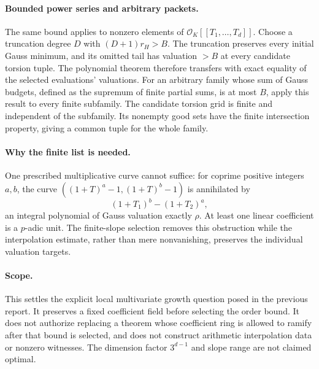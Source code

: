 \paragraph{Bounded power series and arbitrary packets.}
The same bound applies to nonzero elements of
$\mathcal O_K[[T_1,\ldots,T_d]]$. Choose a truncation degree $D$ with
$(D+1)r_H>B$. The truncation preserves every initial Gauss minimum, and
its omitted tail has valuation $>B$ at every candidate torsion tuple.
The polynomial theorem therefore transfers with exact equality of the
selected evaluations' valuations. For an arbitrary family whose sum of
Gauss budgets, defined as the supremum of finite partial sums, is at most
$B$, apply this result to every finite subfamily. The candidate torsion
grid is finite and independent of the subfamily. Its nonempty good sets
have the finite intersection property, giving a common tuple for the
whole family.

\paragraph{Why the finite list is needed.}
One prescribed multiplicative curve cannot suffice: for coprime positive
integers $a,b$, the curve
$((1+T)^a-1,(1+T)^b-1)$ is annihilated by
\[
 (1+T_1)^b-(1+T_2)^a,
\]
an integral polynomial of Gauss valuation exactly $\rho$. At least one
linear coefficient is a $p$-adic unit. The finite-slope selection removes
this obstruction while the interpolation estimate, rather than mere
nonvanishing, preserves the individual valuation targets.

\paragraph{Scope.}
This settles the explicit local multivariate growth question posed in the
previous report. It preserves a fixed coefficient field before selecting
the order bound. It does not authorize replacing a theorem whose
coefficient ring is allowed to ramify after that bound is selected, and
does not construct arithmetic interpolation data or nonzero witnesses.
The dimension factor $3^{d-1}$ and slope range are not claimed optimal.
